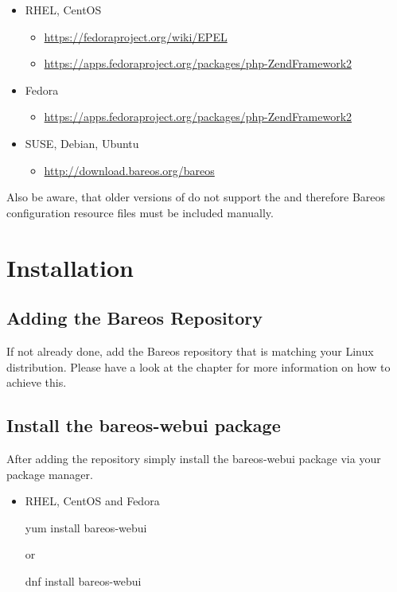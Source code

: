 \begin{itemize}
  \item RHEL, CentOS
    \begin{itemize}
    \item \url{https://fedoraproject.org/wiki/EPEL}
    \item \url{https://apps.fedoraproject.org/packages/php-ZendFramework2}
    \end{itemize}

  \item Fedora
    \begin{itemize}
    \item \url{https://apps.fedoraproject.org/packages/php-ZendFramework2}
    \end{itemize}

  \item SUSE, Debian, Ubuntu
    \begin{itemize}
    \item \url{http://download.bareos.org/bareos}
    \end{itemize}
\end{itemize}

Also be aware, that older versions of \bareosDir do not support the 
and therefore Bareos configuration resource files must be included manually.

\section{Installation}

\subsection{Adding the Bareos Repository}

If not already done, add the Bareos repository that is matching your Linux distribution. Please have a look at the chapter  for more information on how to achieve this.

\subsection{Install the bareos-webui package}

After adding the repository simply install the bareos-webui package via your package manager.

\begin{itemize}
 \item RHEL, CentOS and Fedora
\begin{commands}{}
yum install bareos-webui
\end{commands}
 or
\begin{commands}{}
dnf install bareos-webui
\end{commands}
\end{itemize}

